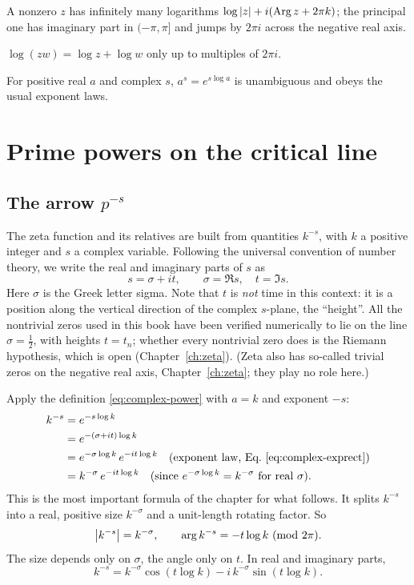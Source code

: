 \begin{keyideas}
\item A nonzero $z$ has infinitely many logarithms $\log\left\lvert z\right\rvert+i(\operatorname{Arg}z+2\pi k)$; the principal one has imaginary part in $(-\pi,\pi]$ and jumps by $2\pi i$ across the negative real axis.
\item $\log(zw)=\log z+\log w$ only up to multiples of $2\pi i$.
\item For positive real $a$ and complex $s$, $a^s=e^{s\log a}$ is unambiguous and obeys the usual exponent laws.
\end{keyideas}

\section{Prime powers on the critical line}\label{sec:complex-primes}

\subsection{The arrow $p^{-s}$}

The zeta function and its relatives are built from quantities $k^{-s}$, with $k$ a positive integer and $s$ a complex variable. Following the universal convention of number theory, we write the real and imaginary parts of $s$ as
\[
s=\sigma+it,\qquad\sigma=\Re s,\quad t=\Im s .
\]
Here $\sigma$ is the Greek letter sigma. Note that $t$ is \emph{not} time in this context: it is a position along the vertical direction of the complex $s$-plane, the ``height''. All the nontrivial zeros used in this book have been verified numerically to lie on the line $\sigma=\tfrac12$, with heights $t=t_n$; whether every nontrivial zero does is the Riemann hypothesis, which is open (Chapter~\ref{ch:zeta}). (Zeta also has so-called trivial zeros on the negative real axis, Chapter~\ref{ch:zeta}; they play no role here.)

Apply the definition \eqref{eq:complex-power} with $a=k$ and exponent $-s$:
\begin{align}
k^{-s}&=e^{-s\log k}\nonumber\\
&=e^{-(\sigma+it)\log k}\nonumber\\
&=e^{-\sigma\log k}\,e^{-it\log k}\quad\text{(exponent law, Eq.~\eqref{eq:complex-exprect})}\nonumber\\
&=k^{-\sigma}\,e^{-it\log k}\quad\text{(since $e^{-\sigma\log k}=k^{-\sigma}$ for real $\sigma$)}.\label{eq:complex-pms}
\end{align}
This is the most important formula of the chapter for what follows. It splits $k^{-s}$ into a real, positive size $k^{-\sigma}$ and a unit-length rotating factor. So
\begin{equation}
\left\lvert k^{-s}\right\rvert=k^{-\sigma},\qquad\arg k^{-s}=-t\log k\ (\text{mod }2\pi).\label{eq:complex-abspms}
\end{equation}
The size depends only on $\sigma$, the angle only on $t$. In real and imaginary parts,
\begin{equation}
k^{-s}=k^{-\sigma}\cos(t\log k)-i\,k^{-\sigma}\sin(t\log k).\label{eq:complex-pmsparts}
\end{equation}

